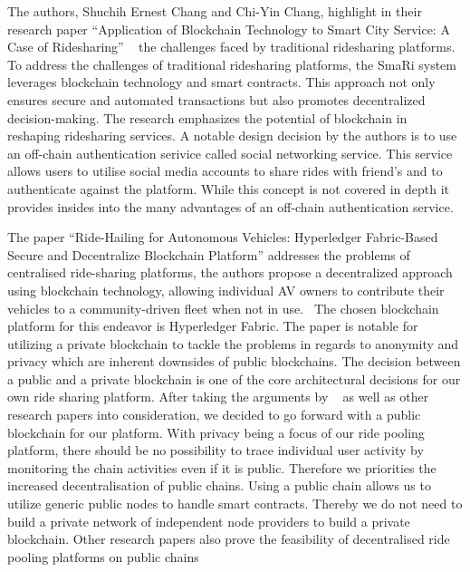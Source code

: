The authors, Shuchih Ernest Chang and Chi-Yin Chang, highlight in their research paper ``Application of Blockchain Technology to Smart City Service: A Case of Ridesharing'' ~\cite{Chang.} the challenges faced by traditional ridesharing platforms. To address the challenges of traditional ridesharing platforms, the SmaRi system leverages blockchain technology and smart contracts. This approach not only ensures secure and automated transactions but also promotes decentralized decision-making. The research emphasizes the potential of blockchain in reshaping ridesharing services. A notable design decision by the authors is to use an off-chain authentication serivice called social networking service. This service allows users to utilise social media accounts to share rides with friend's and to authenticate against the platform. While this concept is not covered in depth it provides insides into the many advantages of an off-chain authentication service.

The paper ``Ride-Hailing for Autonomous Vehicles: Hyperledger Fabric-Based Secure and Decentralize Blockchain Platform'' addresses the problems of centralised ride-sharing platforms, the authors propose a decentralized approach using blockchain technology, allowing individual AV owners to contribute their vehicles to a community-driven fleet when not in use.~\cite{Shivers.} The chosen blockchain platform for this endeavor is Hyperledger Fabric. The paper is notable for utilizing a private blockchain to tackle the problems in regards to anonymity and privacy which are inherent downsides of public blockchains. The decision between a public and a private blockchain is one of the core architectural decisions for our own ride sharing platform.  After taking the arguments by ~\cite{Shivers.} as well as other research papers into consideration, we decided to go forward with a public blockchain for our platform. With privacy being a focus of our ride pooling platform, there should be no possibility to trace individual user activity by monitoring the chain activities even if it is public. Therefore we priorities the increased decentralisation of public chains. Using a public chain allows us to utilize generic public nodes to handle smart contracts. Thereby we do not need to build a private network of independent node providers to build a private blockchain. Other research papers also prove the feasibility of decentralised ride pooling platforms on public chains ~\cite{Mahmoud.2022} ~\cite{Joseph.} ~\cite{Baza.52520205282020}

